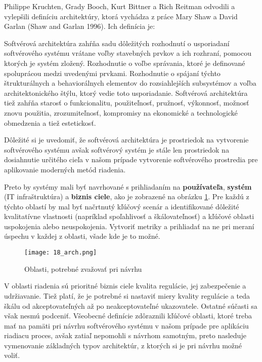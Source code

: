 \indent Philippe Kruchten, Grady Booch, Kurt Bittner a Rich Reitman odvodili a vylepšili definíciu architektúry, ktorá vychádza z práce Mary Shaw a David Garlan (Shaw and Garlan 1996). Ich definícia je:

\indent Softvérová architektúra zahŕňa sadu dôležitých rozhodnutí o usporiadaní softvérového systému vrátane voľby stavebných prvkov a ich rozhraní, pomocou ktorých je systém zložený. Rozhodnutie o voľbe správania, ktoré je definované spoluprácou medzi uvedenými prvkami. Rozhodnutie o spájaní týchto štrukturálnych a behaviorálnych elementov do rozsiahlejších subsystémov a voľba architektonického štýlu, ktorý vedie toto usporiadanie. Softvérová architektúra tiež zahŕňa starosť o funkcionalitu, použiteľnosť, pružnosť, výkonnosť, možnosť znovu použitia, zrozumiteľnosť, kompromisy na ekonomické a technologické obmedzenia a tiež estetickosť. \cite{IOT02}

\indent Dôležité si je uvedomiť, že softvérová architektúra je prostriedok na vytvorenie softvérového systému avšak softvérový systém je stále len prostriedok na dosiahnutie určitého cieľa v našom prípade vytvorenie softvérového prostredia pre aplikovanie moderných metód riadenia.

\indent Preto by systémy mali byť navrhované s prihliadaním na \textbf{používateľa}, \textbf{systém} (IT infraštruktúra) a \textbf{biznis ciele}, ako je zobrazené na obrázku \ref{18_arch}. Pre každú z týchto oblastí by mal byť načrtnutý kľúčový scenár a identifikované dôležité kvalitatívne vlastnosti (napríklad spoľahlivosť a škálovateľnosť) a kľúčové oblasti uspokojenia alebo neuspokojenia. Vytvoriť metriky a prihliadať na ne pri meraní úspechu v každej z oblasti, všade kde je to možné.\cite{IOT02}
\begin{figure}[!htbp]
\centering
\texttt{[image: 18\_arch.png]}
\caption{Oblasti, potrebné zvažovať pri návrhu\cite{IOT02}}
\label{18_arch}
\end{figure}
V oblasti riadenia sú prioritné biznis ciele kvalita regulácie, jej zabezpečenie a udržiavanie. Tiež platí, že je potrebné si nastaviť miery kvality regulácie a teda škálu od akceptovateľných až po neakceptovateľné ukazovatele. Ostatné súčasti sa však nesmú podceniť. Všeobecné definície zdôraznili kľúčové oblasti, ktoré treba mať na pamäti pri návrhu softvérového systému v našom prípade pre aplikáciu riadiacu proces, avšak zatiaľ nepomohli s návrhom samotným, preto nasleduje vymenovanie základných typov architektúr, z ktorých si je pri návrhu možné voliť.


